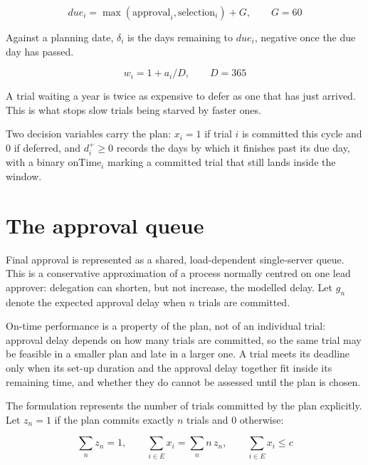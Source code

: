 \begin{equation}
  due_i = \max(\mathrm{approval}_i, \mathrm{selection}_i) + G, \qquad G = 60
  \label{eq:dueday}
\end{equation}

Against a planning date, $\delta_i$ is the days remaining to $due_i$, negative once the due day has passed.

\begin{equation}
  w_i = 1 + a_i / D, \qquad D = 365
  \label{eq:weight}
\end{equation}

A trial waiting a year is twice as expensive to defer as one that has just arrived. This is what stops slow trials being starved by faster ones.

Two decision variables carry the plan: $x_i = 1$ if trial $i$ is committed this cycle and $0$ if deferred, and $d^+_i \ge 0$ records the days by which it finishes past its due day, with a binary $\mathrm{onTime}_i$ marking a committed trial that still lands inside the window.

\section{The approval queue}
\label{sec:queue}

Final approval is represented as a shared, load-dependent single-server queue. This is a conservative approximation of a process normally centred on one lead approver: delegation can shorten, but not increase, the modelled delay. Let $g_n$ denote the expected approval delay when $n$ trials are committed.

On-time performance is a property of the plan, not of an individual trial: approval delay depends on how many trials are committed, so the same trial may be feasible in a smaller plan and late in a larger one. A trial meets its deadline only when its set-up duration and the approval delay together fit inside its remaining time, and whether they do cannot be assessed until the plan is chosen.

The formulation represents the number of trials committed by the plan explicitly. Let $z_n = 1$ if the plan commits exactly $n$ trials and $0$ otherwise:

\begin{equation}
  \sum_n z_n = 1, \qquad \sum_{i \in E} x_i = \sum_n n\, z_n, \qquad \sum_{i \in E} x_i \le c
  \label{eq:loadselector}
\end{equation}


